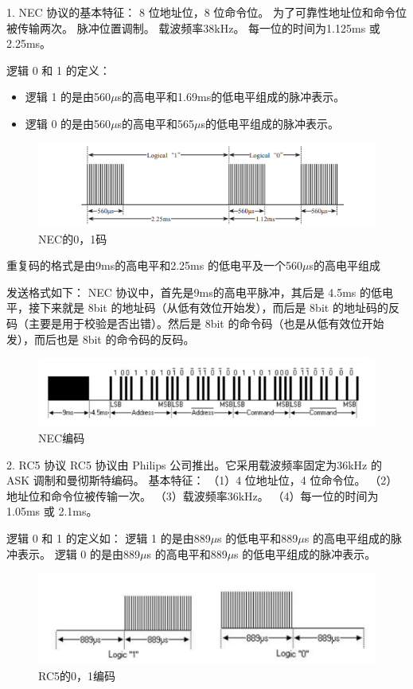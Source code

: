 1. NEC 协议的基本特征：
	8 位地址位，8 位命令位。
	为了可靠性地址位和命令位被传输两次。
	脉冲位置调制。
	载波频率38kHz。
	每一位的时间为1.125ms 或 2.25ms。

逻辑 0 和 1 的定义：
\begin{itemize}
	\item 逻辑 1 的是由560$\mu$s的高电平和1.69ms的低电平组成的脉冲表示。
	\item 逻辑 0 的是由560$\mu$s的高电平和565$\mu$s的低电平组成的脉冲表示。
\end{itemize}
\begin{figure}[htbp]
	\centering
	\includegraphics[width=\linewidth]{figure/4-2}
	\caption{NEC的0，1码}
	\label{fig:4-2}
\end{figure}

重复码的格式是由9ms的高电平和2.25ms 的低电平及一个560$\mu$s的高电平组成

发送格式如下：
NEC 协议中，首先是9ms的高电平脉冲，其后是 4.5ms 的低电平，接下来就是 8bit 的地址码（从低有效位开始发），而后是 8bit 的地址码的反码（主要是用于校验是否出错）。然后是 8bit 的命令码（也是从低有效位开始发），而后也是 8bit 的命令码的反码。
\begin{figure}[htbp]
	\centering
	\includegraphics[width=\linewidth]{figure/4-3}
	\caption{NEC编码}
	\label{fig:4-3}
\end{figure}

2. RC5 协议
RC5 协议由 Philips 公司推出。它采用载波频率固定为36kHz 的 ASK 调制和曼彻斯特编码。
基本特征：
（1）4 位地址位，4 位命令位。
（2）地址位和命令位被传输一次。
（3）载波频率36kHz。
（4）每一位的时间为1.05ms 或 2.1ms。

逻辑 0 和 1 的定义如：
逻辑 1 的是由889$\mu$s 的低电平和889$\mu$s 的高电平组成的脉冲表示。
逻辑 0 的是由889$\mu$s 的高电平和889$\mu$s 的低电平组成的脉冲表示。
\begin{figure}[htbp]
	\centering
	\includegraphics[width=\linewidth]{figure/4-4}
	\caption{RC5的0，1编码}
	\label{fig:4-4}
\end{figure}

